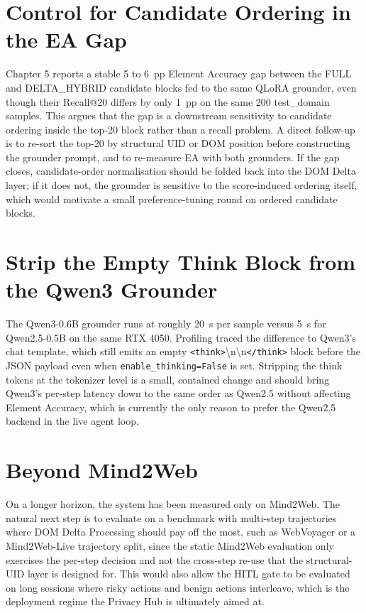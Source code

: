 \section{Control for Candidate Ordering in the EA Gap}
Chapter 5 reports a stable 5 to 6~pp Element Accuracy gap between the FULL and DELTA\_HYBRID candidate blocks fed to the same QLoRA grounder, even though their Recall@20 differs by only 1~pp on the same 200 test\_domain samples. This argues that the gap is a downstream sensitivity to candidate ordering inside the top-20 block rather than a recall problem. A direct follow-up is to re-sort the top-20 by structural UID or DOM position before constructing the grounder prompt, and to re-measure EA with both grounders. If the gap closes, candidate-order normalisation should be folded back into the DOM Delta layer; if it does not, the grounder is sensitive to the score-induced ordering itself, which would motivate a small preference-tuning round on ordered candidate blocks.

\section{Strip the Empty Think Block from the Qwen3 Grounder}
The Qwen3-0.6B grounder runs at roughly 20~s per sample versus 5~s for Qwen2.5-0.5B on the same RTX 4050. Profiling traced the difference to Qwen3's chat template, which still emits an empty \texttt{<think>}\textbackslash n\textbackslash n\texttt{</think>} block before the JSON payload even when \texttt{enable\_thinking=False} is set. Stripping the think tokens at the tokenizer level is a small, contained change and should bring Qwen3's per-step latency down to the same order as Qwen2.5 without affecting Element Accuracy, which is currently the only reason to prefer the Qwen2.5 backend in the live agent loop.

\section{Beyond Mind2Web}
On a longer horizon, the system has been measured only on Mind2Web. The natural next step is to evaluate on a benchmark with multi-step trajectories where DOM Delta Processing should pay off the most, such as WebVoyager or a Mind2Web-Live trajectory split, since the static Mind2Web evaluation only exercises the per-step decision and not the cross-step re-use that the structural-UID layer is designed for. This would also allow the HITL gate to be evaluated on long sessions where risky actions and benign actions interleave, which is the deployment regime the Privacy Hub is ultimately aimed at.

